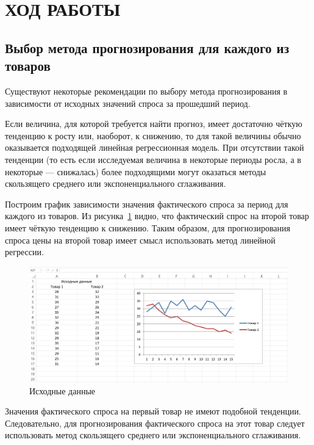 \section{ХОД РАБОТЫ}

\subsection{Выбор метода прогнозирования для каждого из товаров}

Существуют некоторые рекомендации по выбору метода прогнозирования в
зависимости от исходных значений спроса за прошедший период.

Если величина, для которой требуется найти прогноз, имеет достаточно
чёткую тенденцию к росту или, наоборот, к снижению, то для такой величины
обычно оказывается подходящей линейная регрессионная модель. При отсутствии такой
тенденции (то есть если исследуемая величина в некоторые периоды росла,
а в некоторые --- снижалась) более подходящими могут оказаться методы
скользящего среднего или экспоненциального сглаживания.

Построим график зависимости значения фактического спроса за период
для каждого из товаров. Из рисунка~\ref{fig:initial} видно, что
фактический спрос на второй товар имеет чёткую тенденцию к снижению.
Таким образом, для прогнозирования спроса цены на второй товар
имеет смысл использовать метод линейной регрессии.

\begin{figure}[h!]
  \centering
  \includegraphics[width=150mm]{pic/initial}
  \caption{Исходные данные}
  \label{fig:initial}
\end{figure}

Значения фактического спроса на первый товар не имеют подобной тенденции.
Следовательно, для прогнозирования фактического спроса на этот товар следует
использовать метод скользящего среднего или экспоненциального сглаживания.



